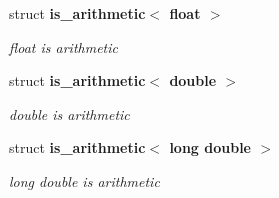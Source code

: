 \begin{CompactItemize}
struct {\bf is\_\-arithmetic$<$ float $>$}
\begin{CompactList}\small\item\em float is arithmetic \item\end{CompactList}\item 
struct {\bf is\_\-arithmetic$<$ double $>$}
\begin{CompactList}\small\item\em double is arithmetic \item\end{CompactList}\item 
struct {\bf is\_\-arithmetic$<$ long double $>$}
\begin{CompactList}\small\item\em long double is arithmetic \item\end{CompactList}\end{CompactItemize}
